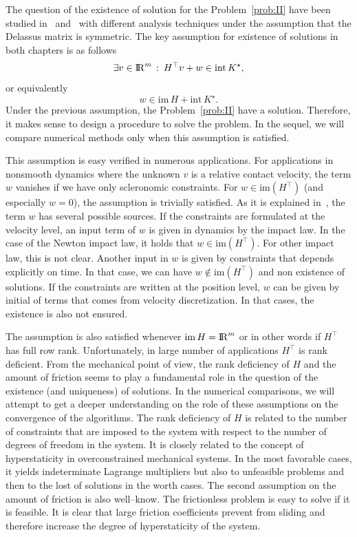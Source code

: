 {The question of the existence of solution for the Problem~\ref{prob:II} have been studied in~\cite{Klarbring.Pang1998} and~\cite{Acary.ea_ZAMM2011} with different analysis techniques under the assumption that the Delassus matrix is symmetric.
The key assumption for existence of solutions in both chapters is as follows
\begin{equation}\label{ass}
   \exists v\in \RR^m \,:\: H^\top v + w \in \mathrm{int}\, K^\star,
\end{equation}
or equivalently
\begin{equation}\label{asseq}
  w\in\mathrm{im}\, H + \mathrm{int}\, K^\star.
\end{equation}
Under the previous assumption, the Problem~\ref{prob:II} have a solution.
Therefore, it makes sense to design a procedure to solve the problem. In the sequel, we will compare numerical methods only when this assumption is satisfied.

This assumption is easy verified in numerous applications. For applications in nonsmooth dynamics where the unknown $v$ is a relative contact velocity, the term $w$ vanishes if we have only scleronomic constraints. For $w \in \mathrm{im}(H^\top)$ (and especially $w=0$), the assumption is trivially satisfied. As it is explained in~\cite{Acary.Cadoux2013}, the term $w$ has several possible sources. If the constraints are formulated at the velocity level, an input term of $w$ is given in dynamics by the impact law. In the case of the Newton impact law, it holds that $w \in \mathrm{im}(H^\top)$.   For other impact law, this is not clear. Another input in $w$ is given by constraints that depends explicitly on time. In that case, we can have $w \not\in \mathrm{im}(H^\top)$ and non existence of solutions. If the constraints are written at the position level, $w$ can be given by initial of terms that comes from velocity discretization. In that cases, the existence is also not ensured.

The assumption is also satisfied {whenever} $\mathrm{im}\, H = \mathrm{I\!R}^m$ or in other words if $H^\top$ has full row rank. Unfortunately, in large number of applications $H^\top$ is rank deficient. 
From the mechanical point of view, the rank deficiency of $H$ and the amount of friction seems to play a fundamental role in the question of the existence (and uniqueness) of solutions. In the numerical comparisons, we will attempt to get a deeper understanding on the role of these assumptions on the convergence of the algorithms. The rank deficiency  of $H$ is related to the number of constraints that are imposed to the system with respect to the number of degrees of freedom in the system. It is closely related to the concept of hyperstaticity in overconstrained mechanical  systems. In the most favorable cases, it yields  indeterminate Lagrange multipliers but also to unfeasible problems and then to the lost of solutions in the worth cases. The second assumption on the amount of friction is also well--know. The frictionless problem is  easy to solve if it is  feasible. It is clear that large friction coefficients prevent from sliding and therefore increase the degree of hyperstaticity of the system. 

}
